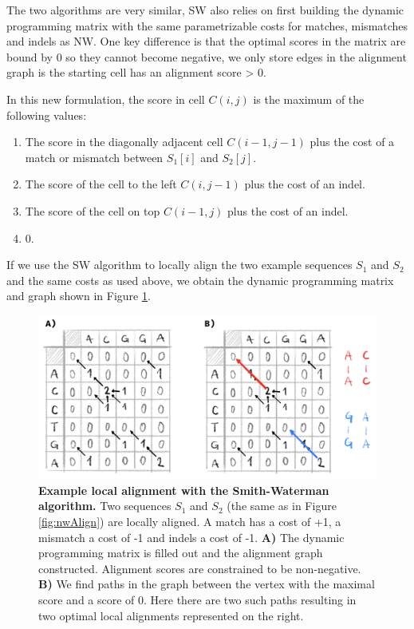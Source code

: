 \documentclass[
  11pt,
  twoside,
  BCOR=10mm,
  listof=totoc]{scrbook}
\providecommand{\tightlist}{%
  \setlength{\itemsep}{0pt}\setlength{\parskip}{0pt}}
\newcommand{\extcaption}[2]{
    \caption[#1]{
        \textbf{#1}\newline
        #2
    }
}
\begin{document}
The two algorithms are very similar, SW also relies on first building the dynamic programming matrix with the same parametrizable costs for matches, mismatches and indels as NW. One key difference is that the optimal scores in the matrix are bound by 0 so they cannot become negative, we only store edges in the alignment graph is the starting cell has an alignment score \textgreater{} 0.

In this new formulation, the score in cell \(C(i,j)\) is the maximum of the following values:

\begin{enumerate}
\def\labelenumi{\arabic{enumi}.}
\tightlist
\item
  The score in the diagonally adjacent cell \(C(i-1,j-1)\) plus the cost of a match or mismatch between \(S_1[i]\) and \(S_2[j]\).
\item
  The score of the cell to the left \(C(i,j-1)\) plus the cost of an indel.
\item
  The score of the cell on top \(C(i-1,j)\) plus the cost of an indel.
\item
  \(0\).
\end{enumerate}

If we use the SW algorithm to locally align the two example sequences \(S_1\) and \(S_2\) and the same costs as used above, we obtain the dynamic programming matrix and graph shown in Figure \ref{fig:swAlign}.

\begin{figure}[h]
\centering
\includegraphics[width=0.6\linewidth]{./figures/Align-Intro/SW-total.png}
\extcaption{Example local alignment with the Smith-Waterman algorithm.}{Two sequences $S_1$ and $S_2$ (the same as in Figure \ref{fig:nwAlign}) are locally aligned. A match has a cost of +1, a mismatch a cost of -1 and indels a cost of -1. \textbf{A)} The dynamic programming matrix is filled out and the alignment graph constructed. Alignment scores are constrained to be non-negative. \textbf{B)} We find paths in the graph between the vertex with the maximal score and a score of 0. Here there are two such paths resulting in two optimal local alignments represented on the right. }
\label{fig:swAlign}
\end{figure}
\end{document}
